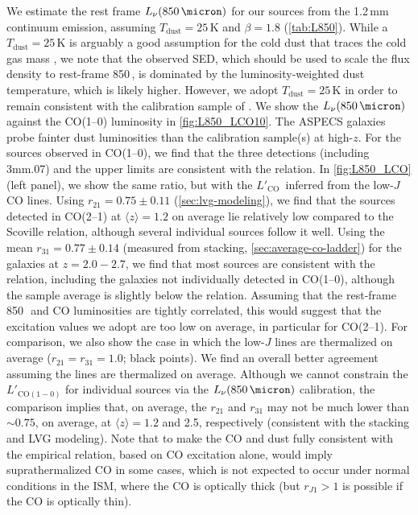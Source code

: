 \documentclass[twocolumn]{aastex62}
\newcommand{\LCO}{\ensuremath{L'_{\mathrm{CO}}}}
\newcommand{\Tdust}{\ensuremath{T_{\mathrm{dust}}}}
\newcommand{\avg}[1]{\ensuremath{\langle #1 \rangle}}
\newcommand{\rTwoOneLVGzLoTwo}{\ensuremath{0.75 \pm 0.11}}
\begin{document}
We estimate the rest frame $L_{\nu}(850\,\micron)$ for our sources from the
1.2\,mm continuum emission, assuming $\Tdust = 25$\,K and $\beta = 1.8$
(\autoref{tab:L850}).  While a $\Tdust = 25$\,K is arguably a good assumption
for the cold dust that traces the cold gas mass \citep{Scoville2016}, we note
that the observed SED, which should be used to scale the flux density to
rest-frame 850\,\micron, is dominated by the luminosity-weighted dust
temperature, which is likely higher.  However, we adopt $\Tdust = 25$\,K in
order to remain consistent with the calibration sample of \cite{Scoville2016}.
We show the $L_{\nu}(850\,\micron)$ against the CO(1--0) luminosity in
\autoref{fig:L850_LCO10}.  The ASPECS galaxies probe fainter dust luminosities
than the calibration sample(s) at high-$z$.  For the sources observed in
CO(1--0), we find that the three detections (including 3mm.07) and the upper
limits are consistent with the \citep{Scoville2016} relation.  In
\autoref{fig:L850_LCO} (left panel), we show the same ratio, but with the \LCO\
inferred from the low-$J$ CO lines.  Using $r_{21} = \rTwoOneLVGzLoTwo$
(\autoref{sec:lvg-modeling}), we find that the sources detected in CO(2--1) at
$\avg{z}=1.2$ on average lie relatively low compared to the Scoville relation,
although several individual sources follow it well.  Using the mean
$r_{31} = 0.77 \pm 0.14$ (measured from stacking,
\autoref{sec:average-co-ladder}) for the galaxies at $z=2.0-2.7$, we find that
most sources are consistent with the relation, including the galaxies not
individually detected in CO(1--0), although the sample average is slightly
below the relation.  Assuming that the rest-frame 850\,\micron\ and CO
luminosities are tightly correlated, this would suggest that the excitation
values we adopt are too low on average, in particular for CO(2--1).  For
comparison, we also show the case in which the low-$J$ lines are thermalized on
average ($r_{21} = r_{31} = 1.0$; black points).  We find an overall better
agreement assuming the lines are thermalized on average.  Although we cannot
constrain the $L'_{\mathrm{CO}(1-0)}$ for individual sources via the
$L_{\nu}(850\,\micron)$ calibration, the comparison implies that, on average,
the $r_{21}$ and $r_{31}$ may not be much lower than $\sim0.75$, on average, at
$\avg{z}=1.2$ and 2.5, respectively (consistent with the stacking and LVG
modeling).  Note that to make the CO and dust fully consistent with the
empirical relation, based on CO excitation alone, would imply suprathermalized
CO in some cases, which is not expected to occur under normal conditions in the
ISM, where the CO is optically thick (but $r_{J1}>1$ is possible if the CO is
optically thin).
\end{document}
